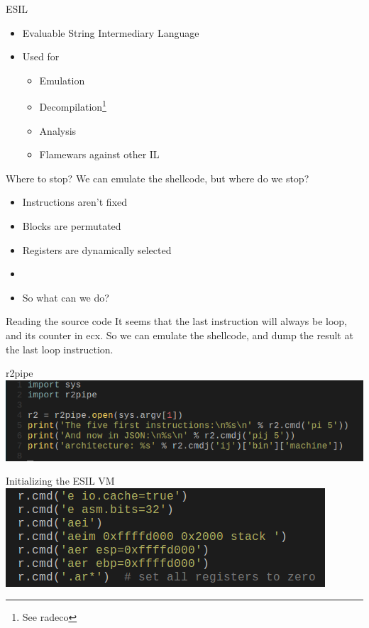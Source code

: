 \documentclass{beamer}
\begin{document}
\begin{frame}{ESIL}
	\begin{itemize}
		\item Evaluable String Intermediary Language
		\item Used for
			\begin{itemize}
				\item Emulation
				\item Decompilation\footnote{See radeco}
				\item Analysis
				\item Flamewars against other IL
			\end{itemize}
		\end{itemize}
\end{frame}

\begin{frame}{Where to stop?}
	We can emulate the shellcode, but where do we stop?
	\begin{itemize}
		\item Instructions aren't fixed
		\item Blocks are permutated
		\item Registers are dynamically selected
		\item{}
		\item So what can we do?
	\end{itemize}
\end{frame}

\begin{frame}{Reading the source code}
	It seems that the last instruction will always be \alert{loop}, and its counter in \alert{ecx}.
	\newline
	So we can emulate the shellcode, and dump the result at the last \alert{loop} instruction.
\end{frame}

\begin{frame}{r2pipe}
	\includegraphics[width=\textwidth]{r2pipe.png}
\end{frame}

\begin{frame}{Initializing the ESIL VM}
	\includegraphics[width=\textwidth]{initmem.png}
\end{frame}
\end{document}
